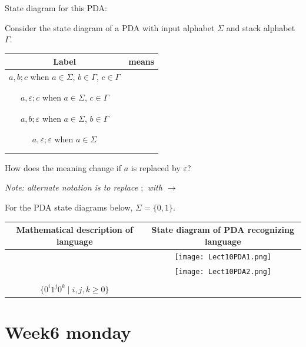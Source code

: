 \documentclass[12pt, oneside]{article}
\begin{document}
    State diagram for this  PDA:

    
\vfill
\newpage
Consider the state diagram of a PDA with input alphabet 
$\Sigma$ and stack alphabet $\Gamma$.

\begin{center}
\begin{tabular}{|c|c|}
\hline
Label & means \\
\hline
$a, b ; c$ when $a \in \Sigma$, $b\in \Gamma$, $c \in \Gamma$ 
& \hspace{3in} \\
& \\
&\\
\hline
$a, \varepsilon ; c$ when $a \in \Sigma$, $c \in \Gamma$ 
& \hspace{3in} \\
& \\
&\\
\hline
$a, b ; \varepsilon$ when $a \in \Sigma$, $b\in \Gamma$
& \hspace{3in} \\
& \\
&\\
\hline
$a, \varepsilon ; \varepsilon$ when $a \in \Sigma$
& \hspace{3in} \\
& \\
&\\
\hline
\end{tabular}
\end{center}


How does the meaning change if $a$ is replaced by $\varepsilon$?

{\it Note: alternate notation is to replace $;$ with $\to$}


For the PDA state diagrams below, $\Sigma = \{0,1\}$.


\begin{center}
\begin{tabular}{c c}
Mathematical description of language & State diagram of PDA recognizing language\\
\hline
& \texttt{[image: Lect10PDA1.png]}\\
\hline
& \texttt{[image: Lect10PDA2.png]}\\
\hline
& \\
$\{ 0^i 1^j 0^k \mid i,j,k \geq 0 \}$ & \\
\end{tabular}
\end{center}
 \vfill
\section*{Week6 monday}
\end{document}
